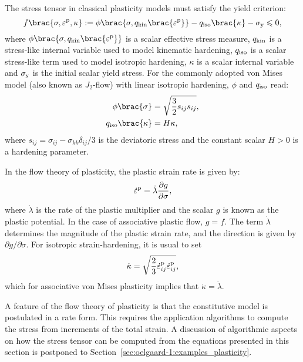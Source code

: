 The stress tensor in classical plasticity models must satisfy the yield
criterion:
%
\begin{equation}
  f\brac{\sigma, \varepsilon^{\rm p}, \kappa} :=
  \phi\brac{\sigma, q_{\rm kin}\brac{\varepsilon^{\rm p}}} - q_{\rm iso}\brac{\kappa} - \sigma_{\rm y} \leqslant 0,
\label{eq:oelgaard-1:plas_yield_function}
\end{equation}
where $\phi\brac{\sigma, q_{\rm kin}\brac{\varepsilon^{\rm p}}}$ is a
scalar effective stress measure, $q_{\rm kin}$ is a stress-like internal
variable used to model kinematic hardening, $q_{\rm iso}$ is a scalar
stress-like term used to model isotropic hardening, $\kappa$ is a scalar
internal variable and $\sigma_{\rm y}$ is the initial scalar yield stress.
For the commonly adopted von Mises model (also known as $J_{2}$-flow)
with linear isotropic hardening, $\phi$ and $q_{\rm iso}$ read:
%
\begin{align}
\label{eq:oelgaard-1:plas_von_mises_linear_hardening}
  \phi\brac{\sigma} &= \sqrt{\frac{3}{2}s_{ij}s_{ij}},
\\
  q_{\rm iso}\brac{\kappa} &= H\kappa,
\end{align}
%
where $s_{ij} = \sigma_{ij} - \sigma_{kk}\delta_{ij}/3$ is the deviatoric
stress and the constant scalar $H > 0$ is a hardening parameter.

In the flow theory of plasticity, the plastic strain rate is given by:
%
\begin{equation}
  \dot{\varepsilon}^{\rm p} = \Dot{\lambda}\frac{\partial g}{\partial\sigma},
\label{eq:oelgaard-1:plas_plas_strain}
\end{equation}
%
where $\Dot{\lambda}$ is the rate of the plastic multiplier and the
scalar $g$ is known as the plastic potential.  In the case of associative
plastic flow, $g = f$.  The term $\dot{\lambda}$ determines the magnitude
of the plastic strain rate, and the direction is given by $\partial
g/\partial\sigma$.  For isotropic strain-hardening, it is usual to set
%
\begin{equation}
  \dot{\kappa} = \sqrt{\frac{2}{3} \dot{\varepsilon}^{\rm p}_{ij}\dot{\varepsilon}^{\rm p}_{ij}},
\end{equation}
%
which for associative von Mises plasticity implies that $\dot{\kappa}
= \dot{\lambda}$.

A feature of the flow theory of plasticity is that the constitutive
model is postulated in a rate form. This requires the application
algorithms to compute the stress from increments of the total strain.
A discussion of algorithmic aspects on how the stress tensor can be
computed from the equations presented in this section is postponed to
Section~\ref{sec:oelgaard-1:examples_plasticity}.

